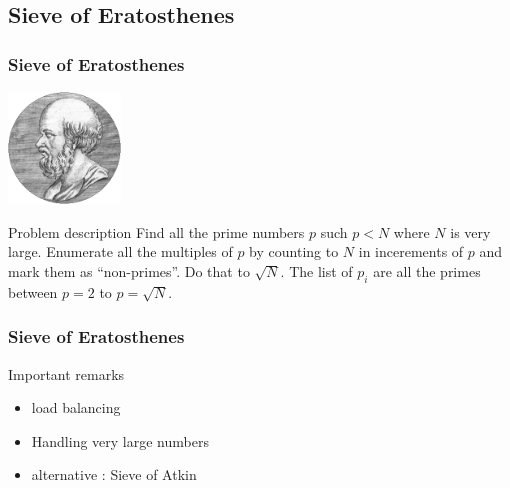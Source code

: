 \subsection{Sieve of Eratosthenes}
\begin{frame}[containsverbatim]
\frametitle{Sieve of Eratosthenes}
\begin{center}
\includegraphics[width=3.0cm]{Day2/images/Eratosthene.png}
\end{center}
\begin{block}{Problem description}
Find all the prime numbers $p$ such $p < N$ where $N$ is very large. Enumerate all the multiples of $p$ by counting to $N$ in incerements of $p$ and mark them as ``non-primes''. Do that to $\sqrt{N}$. The list of $p_i$ are all the primes between $p=2$ to $p=\sqrt{N}$.
\end{block}
\end{frame}
\begin{frame}[containsverbatim]
\frametitle{Sieve of Eratosthenes}
\begin{block}{Important remarks}
\begin{itemize}
	\item{load balancing}
	\item{Handling very large numbers}
	\item{alternative : Sieve of Atkin}
\end{itemize}
\end{block}
\end{frame}





